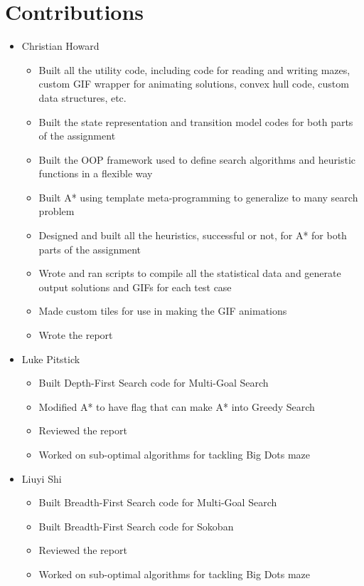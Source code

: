 \documentclass{article}[12pt]
\begin{document}
\section{Contributions}
\begin{itemize}
\item Christian Howard
	\begin{itemize}
	\item Built all the utility code, including code for reading and writing mazes, custom GIF wrapper for animating solutions, convex hull code, custom data structures, etc.
	\item Built the state representation and transition model codes for both parts of the assignment
	\item Built the OOP framework used to define search algorithms and heuristic functions in a flexible way
	\item Built A* using template meta-programming to generalize to many search problem
	\item Designed and built all the heuristics, successful or not, for A* for both parts of the assignment
	\item Wrote and ran scripts to compile all the statistical data and generate output solutions and GIFs for each test case
	\item Made custom tiles for use in making the GIF animations
	\item Wrote the report
	\end{itemize}
\item Luke Pitstick
	\begin{itemize}
	\item Built Depth-First Search code for Multi-Goal Search
	\item Modified A* to have flag that can make A* into Greedy Search
	\item Reviewed the report
	\item Worked on sub-optimal algorithms for tackling Big Dots maze
	\end{itemize}
\item Liuyi Shi
	\begin{itemize}
	\item Built Breadth-First Search code for Multi-Goal Search
	\item Built Breadth-First Search code for Sokoban
	\item Reviewed the report
	\item Worked on sub-optimal algorithms for tackling Big Dots maze
	\end{itemize}
\end{itemize}   
   
\end{document}
